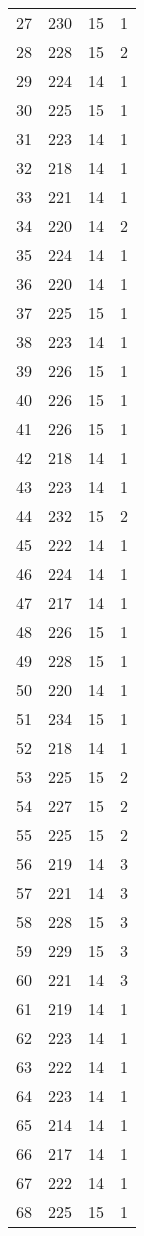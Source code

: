 \begin{longtable}[!]{c|ccc}
	27	& 230	& 15	& 1	\\
	28	& 228	& 15	& 2	\\
	29	& 224	& 14	& 1	\\
	30	& 225	& 15	& 1	\\
	31	& 223	& 14	& 1	\\
	32	& 218	& 14	& 1	\\
	33	& 221	& 14	& 1	\\
	34	& 220	& 14	& 2	\\
	35	& 224	& 14	& 1	\\
	36	& 220	& 14	& 1	\\
	37	& 225	& 15	& 1	\\
	38	& 223	& 14	& 1	\\
	39	& 226	& 15	& 1	\\
	40	& 226	& 15	& 1	\\
	41	& 226	& 15	& 1	\\
	42	& 218	& 14	& 1	\\
	43	& 223	& 14	& 1	\\
	44	& 232	& 15	& 2	\\
	45	& 222	& 14	& 1	\\
	46	& 224	& 14	& 1	\\
	47	& 217	& 14	& 1	\\
	48	& 226	& 15	& 1	\\
	49	& 228	& 15	& 1	\\
	50	& 220	& 14	& 1	\\
	51	& 234	& 15	& 1	\\
	52	& 218	& 14	& 1	\\
	53	& 225	& 15	& 2	\\
	54	& 227	& 15	& 2	\\
	55	& 225	& 15	& 2	\\
	56	& 219	& 14	& 3	\\
	57	& 221	& 14	& 3	\\
	58	& 228	& 15	& 3	\\
	59	& 229	& 15	& 3	\\
	60	& 221	& 14	& 3	\\
	61	& 219	& 14	& 1	\\
	62	& 223	& 14	& 1	\\
	63	& 222	& 14	& 1	\\
	64	& 223	& 14	& 1	\\
	65	& 214	& 14	& 1	\\
	66	& 217	& 14	& 1	\\
	67	& 222	& 14	& 1	\\
	68	& 225	& 15	& 1	\\

\end{longtable}

